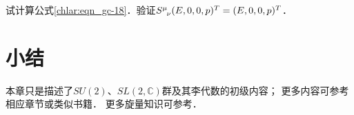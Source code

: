 \begin{exercise}
	试计算公式\eqref{chlar:eqn_gc-18}．验证$S^\mu_{\hphantom{\mu}\nu} (E,0,0,p)^T=(E,0,0,p)^T$．
\end{exercise}







\section*{小结}


本章只是描述了$SU(2)$、$SL(2,\mathbb{C})$群及其李代数的初级内容；
更多内容可参考\parencite{carmeli-rl1976,taorb-2011-gt}相应章节或类似书籍．  
更多旋量知识可参考\parencite{penrose-Rindler1984}．


\printbibliography[heading=subbibliography,title=第\ref{chlar}章参考文献]

\endinput














